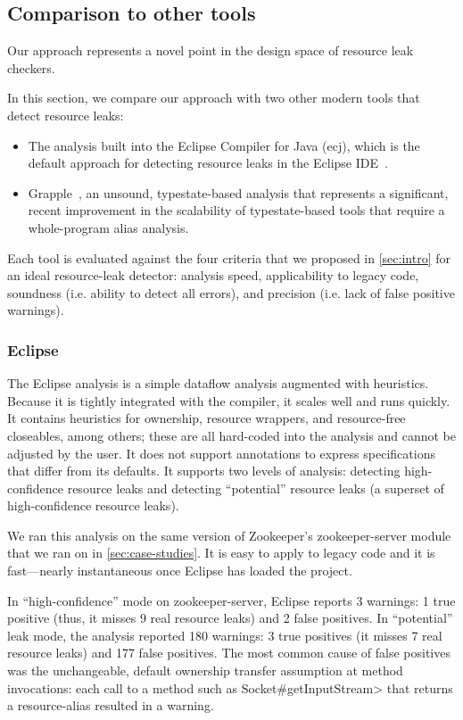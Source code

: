\subsection{Comparison to other tools}
\label{sec:compare}

Our approach represents a novel point in the design space of resource leak checkers.

In this section, we compare our approach with two other modern tools that detect resource leaks:
\begin{itemize}
\item The analysis built into the Eclipse Compiler for Java (ecj), which is the default approach
  for detecting resource leaks in the Eclipse IDE~\cite{ecj-resource-leak}.
\item Grapple~\cite{zuo2019grapple}, an unsound, typestate-based analysis that represents a significant, recent
  improvement in the scalability of typestate-based tools that require a whole-program alias analysis.
\end{itemize}
Each tool is evaluated against the four criteria that we proposed in \cref{sec:intro}
for an ideal resource-leak detector: analysis speed, applicability to legacy code, soundness (i.e. ability
to detect all errors), and precision (i.e. lack of false positive warnings).

\subsubsection{Eclipse}
\label{sec:eclipse}

The Eclipse analysis is a simple dataflow analysis
augmented with heuristics. Because it is tightly integrated with
the compiler, it scales well and runs quickly. It contains
heuristics for ownership, resource wrappers, and resource-free
closeables, among others; these are all hard-coded into the analysis and cannot
be adjusted by the user. It does not support annotations to express
specifications that differ from its defaults.
It supports two levels of analysis: detecting high-confidence resource
leaks and detecting ``potential'' resource
leaks (a superset of high-confidence resource leaks).

We ran this analysis on the same version of Zookeeper's zookeeper-server
module that we ran \Tool on in \cref{sec:case-studies}. It is easy to apply
to legacy code and it is fast---nearly instantaneous once Eclipse
has loaded the project.

In ``high-confidence'' mode on zookeeper-server, Eclipse reports 3
warnings: 1 true positive (thus, it misses 9 real resource leaks) and 2
false positives.
In ``potential'' leak mode, the analysis reported 180
warnings:  3 true positives (it misses 7 real resource leaks) and 177 false
positives.
The most common cause of false
positives was the unchangeable, default ownership transfer assumption
at method invocations: each call to a method such as
\<Socket\#getInputStream> that returns a resource-alias resulted in a
warning.

